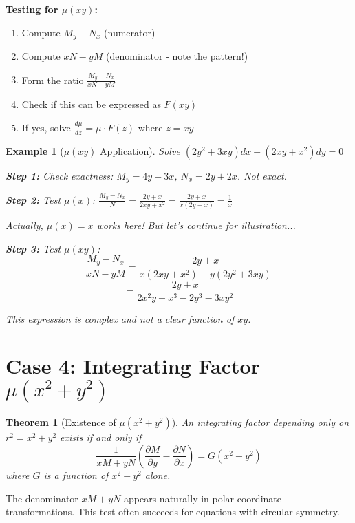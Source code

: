 \documentclass[12pt]{article}
\newtheorem{theorem}{Theorem}
\newtheorem{example}{Example}
\begin{document}
\begin{algorithm}
\textbf{Testing for $\mu(xy)$:}
\begin{enumerate}
    \item Compute $M_y - N_x$ (numerator)
    \item Compute $xN - yM$ (denominator - note the pattern!)
    \item Form the ratio $\frac{M_y - N_x}{xN - yM}$
    \item Check if this can be expressed as $F(xy)$
    \item If yes, solve $\frac{d\mu}{dz} = \mu \cdot F(z)$ where $z = xy$
\end{enumerate}
\end{algorithm}

\begin{example}[$\mu(xy)$ Application]
Solve $(2y^2 + 3xy)dx + (2xy + x^2)dy = 0$

\textbf{Step 1:} Check exactness: $M_y = 4y + 3x$, $N_x = 2y + 2x$. Not exact.

\textbf{Step 2:} Test $\mu(x)$: $\frac{M_y - N_x}{N} = \frac{2y + x}{2xy + x^2} = \frac{2y + x}{x(2y + x)} = \frac{1}{x}$

Actually, $\mu(x) = x$ works here! But let's continue for illustration...

\textbf{Step 3:} Test $\mu(xy)$:
\[\frac{M_y - N_x}{xN - yM} = \frac{2y + x}{x(2xy + x^2) - y(2y^2 + 3xy)}\]
\[= \frac{2y + x}{2x^2y + x^3 - 2y^3 - 3xy^2}\]

This expression is complex and not a clear function of $xy$.
\end{example}

\section{Case 4: Integrating Factor $\mu(x^2 + y^2)$}

\begin{theorem}[Existence of $\mu(x^2 + y^2)$]
An integrating factor depending only on $r^2 = x^2 + y^2$ exists if and only if
\[\frac{1}{xM + yN}\left(\frac{\partial M}{\partial y} - \frac{\partial N}{\partial x}\right) = G(x^2 + y^2)\]
where $G$ is a function of $x^2 + y^2$ alone.
\end{theorem}

\begin{insight}
The denominator $xM + yN$ appears naturally in polar coordinate transformations. This test often succeeds for equations with circular symmetry.
\end{insight}
\end{document}
